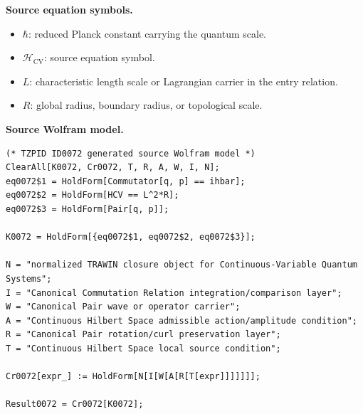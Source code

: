 \begin{minipage}[t]{0.49\linewidth}
\begingroup
\small
\raggedright
\textbf{Source equation symbols.}\par
\begin{itemize}[leftmargin=1.35em,itemsep=1pt,topsep=1pt,parsep=0pt]
    \item $\hbar$: reduced Planck constant carrying the quantum scale.
    \item $\mathcal{H}_{\mathrm{CV}}$: source equation symbol.
    \item $L$: characteristic length scale or Lagrangian carrier in the entry relation.
    \item $R$: global radius, boundary radius, or topological scale.
\end{itemize}
\endgroup
\end{minipage}\hfill
\begin{minipage}[t]{0.47\linewidth}
\begingroup
\scriptsize
\raggedright
\textbf{Source Wolfram model.}\par
\begin{Verbatim}[fontsize=\tiny,breaklines=true,breakanywhere=true]
(* TZPID ID0072 generated source Wolfram model *)
ClearAll[K0072, Cr0072, T, R, A, W, I, N];
eq0072$1 = HoldForm[Commutator[q, p] == ihbar];
eq0072$2 = HoldForm[HCV == L^2*R];
eq0072$3 = HoldForm[Pair[q, p]];

K0072 = HoldForm[{eq0072$1, eq0072$2, eq0072$3}];

N = "normalized TRAWIN closure object for Continuous-Variable Quantum Systems";
I = "Canonical Commutation Relation integration/comparison layer";
W = "Canonical Pair wave or operator carrier";
A = "Continuous Hilbert Space admissible action/amplitude condition";
R = "Canonical Pair rotation/curl preservation layer";
T = "Continuous Hilbert Space local source condition";

Cr0072[expr_] := HoldForm[N[I[W[A[R[T[expr]]]]]]];

Result0072 = Cr0072[K0072];
\end{Verbatim}
\endgroup
\end{minipage}

